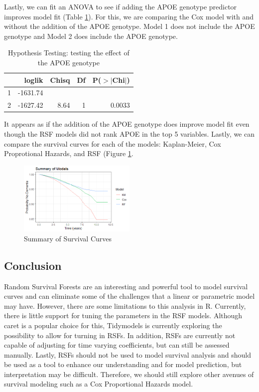 \documentclass[a4paper,man,natbib,11pt]{article}
\begin{document}
Lastly, we can fit an ANOVA to see if adding the APOE genotype predictor improves model fit (Table \ref{anova}). For this, we are comparing the Cox model with and without the addition of the APOE genotype. Model 1 does not include the APOE genotype and Model 2 does include the APOE genotype. 

\begin{table}[ht]
\centering
\caption{Hypothesis Testing: testing the effect of the APOE genotype}
\begin{tabular}{lrrrr}
  \hline
 & loglik & Chisq & Df & P($>$$|$Chi$|$) \\ 
  \hline
1 & -1631.74 &  &  &  \\ 
  2 & -1627.42 & 8.64 & 1 & 0.0033 \\ 
   \hline
\end{tabular}
\label{anova}
\end{table}

It appears as if the addition of the APOE genotype does improve model fit even though the RSF models did not rank APOE in the top 5 variables. Lastly, we can compare the survival curves for each of the models: Kaplan-Meier, Cox Proprotional Hazards, and RSF (Figure \ref{fig:all_curves}. 

\begin{figure}[h!]%
    \centering
    \includegraphics[width=0.5\textwidth]{figures/Summary_curves.png}
    \caption{Summary of Survival Curves}%
    \label{fig:all_curves}%
\end{figure}

\subsection{Conclusion}

Random Survival Forests are an interesting and powerful tool to model survival curves and can eliminate some of the challenges that a linear or parametric model may have. However, there are some limitations to this analysis in R. Currently, there is little support for tuning the parameters in the RSF models. Although caret is a popular choice for this, Tidymodels is currently exploring the possibility to allow for turning in RSFs. In addition, RSFs are currently not capable of adjusting for time varying coefficients, but can still be assessed manually. Lastly, RSFs should not be used to model survival analysis and should be used as a tool to enhance our understanding and for model prediction, but interpretation may be difficult. Therefore, we should still explore other avenues of survival modeling such as a Cox Proportional Hazards model.
\end{document}

